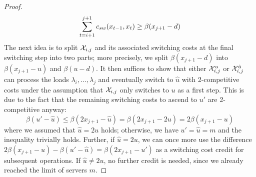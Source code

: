 \begin{proof}
\begin{equation*}
	\sum\limits_{t=i+1}^{j+1}c_{sw}(x_{t-1},x_t)\ge\beta(x_{j+1}-d)
\end{equation*}
The next idea is to split $\mathcal{X}_{i,j}$ and its associated switching costs at the final switching step into two parts; more precisely, we split $\beta(x_{j+1}-d)$ into $\beta(x_{j+1}-u)$ and $\beta(u-d)$. It then suffices to show that either $\mathcal{X}_{i,j}^u$ or $\mathcal{X}_{i,j}^{\hat{u}}$ can process the loads $\lambda_i,\dotsc,\lambda_j$ and eventually switch to $\hat{u}$ with 2-competitive costs under the assumption that $\mathcal{X}_{i,j}$ only switches to $u$ as a first step. This is due to the fact that the remaining switching costs to ascend to $u'$ are 2-competitive anyway:
\begin{equation*}
	\beta(u'-\hat{u})\le\beta(2x_{j+1}-\hat{u})=\beta(2x_{j+1}-2u)=2\beta(x_{j+1}-u)
\end{equation*}
where we assumed that $\hat{u}=2u$ holds; otherwise, we have $u'=\hat{u}=m$ and the inequality trivially holds. Further, if $\hat{u}=2u$, we can once more use the difference $2\beta(x_{j+1}-u)-\beta(u'-\hat{u})=\beta(2x_{j+1}-u')$ as a switching cost credit for subsequent operations. If $\hat{u}\neq2u$, no further credit is needed, since we already reached the limit of servers $m$.


\end{proof}
